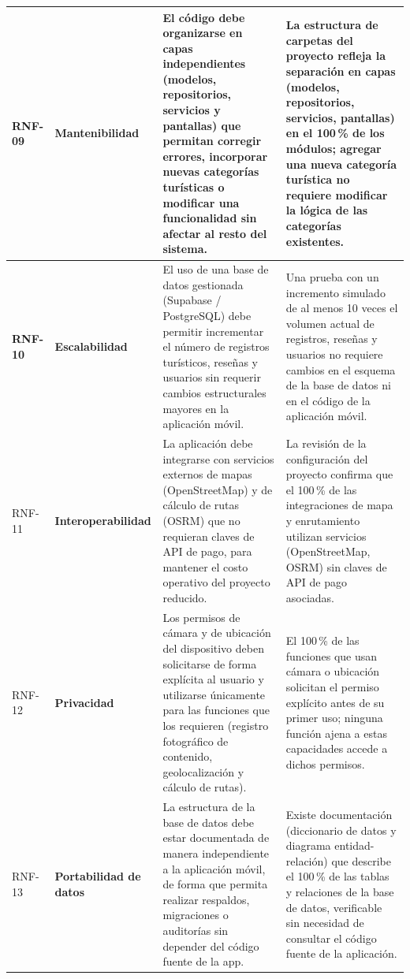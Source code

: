 \begin{longtable}{|>{\bfseries}p{1.2cm}|>{\bfseries}p{2.3cm}|p{4.8cm}|p{4.8cm}|}
RNF-09 & Mantenibilidad & El código debe organizarse en capas independientes (modelos, repositorios, servicios y pantallas) que permitan corregir errores, incorporar nuevas categorías turísticas o modificar una funcionalidad sin afectar al resto del sistema. & La estructura de carpetas del proyecto refleja la separación en capas (modelos, repositorios, servicios, pantallas) en el 100\,\% de los módulos; agregar una nueva categoría turística no requiere modificar la lógica de las categorías existentes. \\ \hline

RNF-10 & Escalabilidad & El uso de una base de datos gestionada (Supabase / PostgreSQL) debe permitir incrementar el número de registros turísticos, reseñas y usuarios sin requerir cambios estructurales mayores en la aplicación móvil. & Una prueba con un incremento simulado de al menos 10 veces el volumen actual de registros, reseñas y usuarios no requiere cambios en el esquema de la base de datos ni en el código de la aplicación móvil. \\ \hline

RNF-11 & Interoperabilidad & La aplicación debe integrarse con servicios externos de mapas (OpenStreetMap) y de cálculo de rutas (OSRM) que no requieran claves de API de pago, para mantener el costo operativo del proyecto reducido. & La revisión de la configuración del proyecto confirma que el 100\,\% de las integraciones de mapa y enrutamiento utilizan servicios (OpenStreetMap, OSRM) sin claves de API de pago asociadas. \\ \hline

RNF-12 & Privacidad & Los permisos de cámara y de ubicación del dispositivo deben solicitarse de forma explícita al usuario y utilizarse únicamente para las funciones que los requieren (registro fotográfico de contenido, geolocalización y cálculo de rutas). & El 100\,\% de las funciones que usan cámara o ubicación solicitan el permiso explícito antes de su primer uso; ninguna función ajena a estas capacidades accede a dichos permisos. \\ \hline

RNF-13 & Portabilidad de datos & La estructura de la base de datos debe estar documentada de manera independiente a la aplicación móvil, de forma que permita realizar respaldos, migraciones o auditorías sin depender del código fuente de la app. & Existe documentación (diccionario de datos y diagrama entidad-relación) que describe el 100\,\% de las tablas y relaciones de la base de datos, verificable sin necesidad de consultar el código fuente de la aplicación. \\ \hline

\end{longtable}

